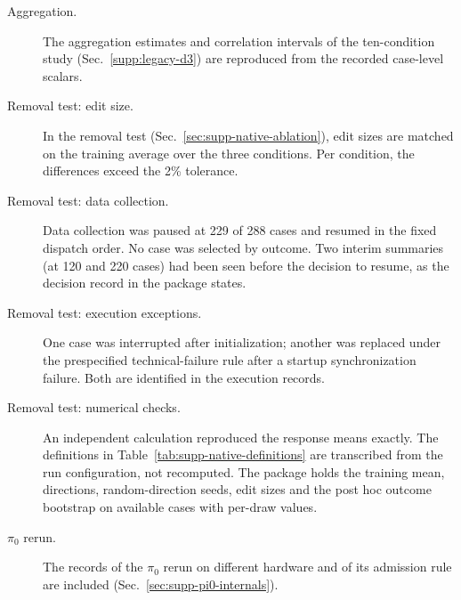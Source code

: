 \begin{description}
\item[Aggregation.] The aggregation estimates and correlation intervals of the ten-condition study (Sec.~\ref{supp:legacy-d3}) are reproduced from the recorded case-level scalars.
\item[Removal test: edit size.] In the removal test (Sec.~\ref{sec:supp-native-ablation}), edit sizes are matched on the training average over the three conditions. Per condition, the differences exceed the 2\% tolerance.
\item[Removal test: data collection.] Data collection was paused at 229 of 288 cases and resumed in the fixed dispatch order. No case was selected by outcome. Two interim summaries (at 120 and 220 cases) had been seen before the decision to resume, as the decision record in the package states.
\item[Removal test: execution exceptions.] One case was interrupted after initialization; another was replaced under the prespecified technical-failure rule after a startup synchronization failure. Both are identified in the execution records.
\item[Removal test: numerical checks.] An independent calculation reproduced the response means exactly. The definitions in Table~\ref{tab:supp-native-definitions} are transcribed from the run configuration, not recomputed. The package holds the training mean, directions, random-direction seeds, edit sizes and the post hoc outcome bootstrap on available cases with per-draw values.
\item[$\pi_0$ rerun.] The records of the $\pi_0$ rerun on different hardware and of its admission rule are included (Sec.~\ref{sec:supp-pi0-internals}).
\end{description}
